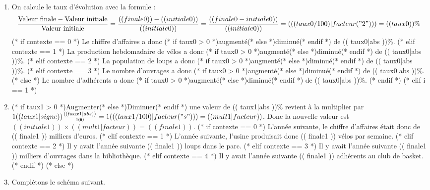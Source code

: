\exercice*

\begin{enumerate}
  (* for i in ordre *)
    (* if i == 0 *)
      \item On calcule le taux d'évolution avec la formule :
        \[
          \frac{\text{Valeur finale} - \text{Valeur initiale}}{\text{Valeur initiale}}=\frac{(( finale0 )) - (( initiale0 ))}{(( initiale0 ))}=\frac{(( finale0 - initiale0 ))}{(( initiale0 ))}=(( (taux0 / 100)|facteur("2") ))=(( taux0 ))\%
        \]
        (* if contexte == 0 *)
          Le chiffre d'affaires a donc (* if taux0 > 0 *)augmenté(* else *)diminué(* endif *) de (( taux0|abs ))\%.
        (* elif contexte == 1 *)
          La production hebdomadaire de vélos a donc (* if taux0 > 0 *)augmenté(* else *)diminué(* endif *) de (( taux0|abs ))\%.
        (* elif contexte == 2 *)
          La population de loups a donc (* if taux0 > 0 *)augmenté(* else *)diminué(* endif *) de (( taux0|abs ))\%.
        (* elif contexte == 3 *)
          Le nombre d'ouvrages a donc (* if taux0 > 0 *)augmenté(* else *)diminué(* endif *) de (( taux0|abs ))\%.
        (* else *)
          Le nombre d'adhérents a donc (* if taux0 > 0 *)augmenté(* else *)diminué(* endif *) de (( taux0|abs ))\%.
        (* endif *)
    (* elif i == 1 *)
      \item
          (* if taux1 > 0 *)Augmenter(* else *)Diminuer(* endif *) une valeur de (( taux1|abs ))\% revient à la multiplier par $1(( taux1 | signe ))\frac{(( taux1|abs ))}{100}=1(( (taux1/100)|facteur("s") ))=(( mult1|facteur ))$.
          Donc la nouvelle valeur est $(( initiale1 ))\times (( mult1|facteur ))=(( finale1 ))$.
          (* if contexte == 0 *)
          L'année suivante, le chiffre d'affaires était donc de (( finale1 )) milliers d'euros.
          (* elif contexte == 1 *)
          L'année suivante, l'usine produisait donc (( finale1 )) vélos par semaine.
          (* elif contexte == 2 *)
          Il y avait l'année suivante (( finale1 )) loups dans le parc.
          (* elif contexte == 3 *)
          Il y avait l'année suivante (( finale1 )) milliers d'ouvrages dans la bibliothèque.
          (* elif contexte == 4 *)
          Il y avait l'année suivante (( finale1 )) adhérents au club de basket.
          (* endif *)
    (* else *)
      \item Complétons le schéma suivant.
        \begin{center}
\end{center}
\end{enumerate}
